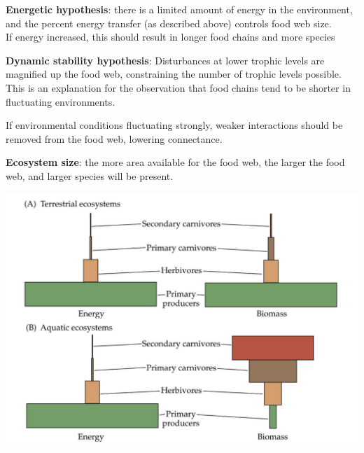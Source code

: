 \documentclass[12pt]{article}
\begin{document}
\textbf{Energetic hypothesis}: there is a limited amount of energy in the environment, and the percent energy transfer (as described above) controls food web size. \\

If energy increased, this should result in longer food chains and more species


\textbf{Dynamic stability hypothesis}: Disturbances at lower trophic levels are magnified up the food web, constraining the number of trophic levels possible. This is an explanation for the observation that food chains tend to be shorter in fluctuating environments. 

If environmental conditions fluctuating strongly, weaker interactions should be removed from the food web, lowering connectance. 


\textbf{Ecosystem size}: the more area available for the food web, the larger the food web, and larger species will be present.








\includegraphics[width=\textwidth]{figs/foodwebz.png}
\end{document}
